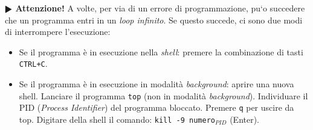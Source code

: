 \documentclass[11pt]{article}
\begin{document}
\begin{mdframed}[backgroundcolor=gray!10]
\textbf{$\RHD$ Attenzione!}
A volte, per via di un errore di programmazione, pu`o succedere che un programma entri in un {\em loop infinito}.
Se questo succede, ci sono due modi di interrompere l'esecuzione:
\begin{itemize}
\item Se il programma \`e in esecuzione nella {\em shell}: premere la combinazione di tasti \texttt{CTRL+C}.
\item Se il programma \`e in esecuzione in modalit\`a {\em background}:
aprire una nuova shell. Lanciare il programma \texttt{top} (non in modalit\`a
 {\em background}). Individuare il PID ({\em Process Identifier}) del programma bloccato. Premere \texttt{q} per uscire da top.
Digitare della shell il comando: \texttt{kill -9 numero$_{PID}$} (Enter).
\end{itemize}
\end{mdframed}

 
\end{document}

